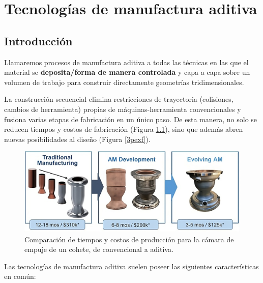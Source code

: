 \chapter{Tecnologías de manufactura aditiva}

\section{Introducción}

Llamaremos procesos de manufactura aditiva a todas las técnicas en las que el material se \textbf
{deposita/forma de manera controlada} y capa a capa sobre un volumen de trabajo para construir directamente geometrías tridimensionales. 

La construcción secuencial elimina restricciones de trayectoria (colisiones, cambios de herramienta) propias de máquinas-herramienta convencionales y fusiona varias etapas de fabricación en un único paso. De esta manera, no solo se reducen tiempos y costos de fabricación (Figura \ref{roki}), sino que además abren nuevas posibilidades al diseño (Figura \ref{3pexf}).
 
\begin{figure}[h!]
	\centering
	\includegraphics[width=0.8\linewidth]{imgs/rocket.png}
	\caption{Comparación de tiempos y costos de producción para la cámara de empuje de un cohete, de convencional a aditiva.\cite{rokeke}}
	\label{roki}
\end{figure}

Las tecnologías de manufactura aditiva suelen poseer las siguientes características en común:

